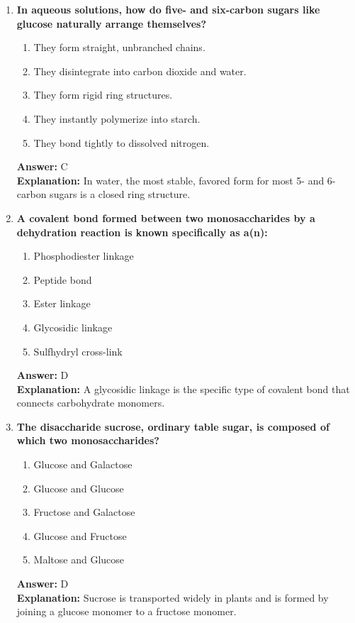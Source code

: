 \documentclass[11pt, a4paper]{article}
\begin{document}
\begin{enumerate}
\item \textbf{In aqueous solutions, how do five- and six-carbon sugars like glucose naturally arrange themselves?}
\begin{enumerate}[label=\Alph*.]
    \item They form straight, unbranched chains.
    \item They disintegrate into carbon dioxide and water.
    \item They form rigid ring structures.
    \item They instantly polymerize into starch.
    \item They bond tightly to dissolved nitrogen.
\end{enumerate}
\textbf{Answer:} C \\
\textbf{Explanation:} In water, the most stable, favored form for most 5- and 6-carbon sugars is a closed ring structure.

\item \textbf{A covalent bond formed between two monosaccharides by a dehydration reaction is known specifically as a(n):}
\begin{enumerate}[label=\Alph*.]
    \item Phosphodiester linkage
    \item Peptide bond
    \item Ester linkage
    \item Glycosidic linkage
    \item Sulfhydryl cross-link
\end{enumerate}
\textbf{Answer:} D \\
\textbf{Explanation:} A glycosidic linkage is the specific type of covalent bond that connects carbohydrate monomers.

\item \textbf{The disaccharide sucrose, ordinary table sugar, is composed of which two monosaccharides?}
\begin{enumerate}[label=\Alph*.]
    \item Glucose and Galactose
    \item Glucose and Glucose
    \item Fructose and Galactose
    \item Glucose and Fructose
    \item Maltose and Glucose
\end{enumerate}
\textbf{Answer:} D \\
\textbf{Explanation:} Sucrose is transported widely in plants and is formed by joining a glucose monomer to a fructose monomer.


\end{enumerate}
\end{document}
